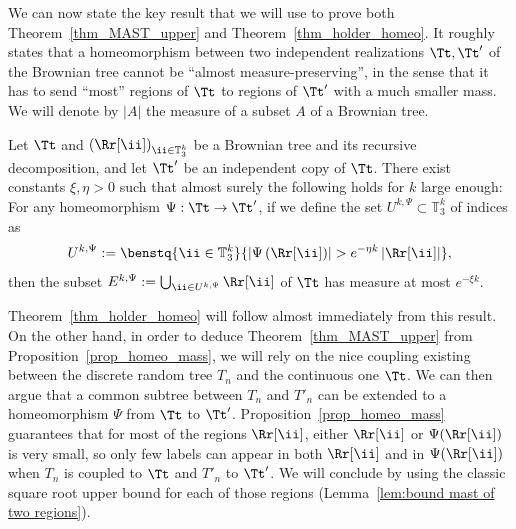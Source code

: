 We can now state the key result that we will use to prove both Theorem~\ref{thm_MAST_upper} and Theorem~\ref{thm_holder_homeo}.
It roughly states that a homeomorphism between two independent rea\-lizations $\Tt, \Tt'$ of the Brownian tree cannot be ``almost measure-preserving'', in the sense that it has to send ``most'' regions of $\Tt$ to regions of $\Tt'$ with a much smaller mass. We will denote by $|A|$ the measure of a subset $A$ of a Brownian tree.
\begin{proposition}\label{prop_homeo_mass}
Let $\Tt$ and $\left( \Rr[\ii] \right)_{\ii \in \mathbb{T}_3^k}$ be a Brownian tree and its recursive decomposition, and let $\Tt'$ be an independent copy of $\Tt$. There exist constants $\xi, \eta>0$ such that almost surely the following holds for $k$ large enough:
For any homeomorphism $\Psi : \Tt \to \Tt'$,
if we define the set $U^{k,\Psi} \subset \mathbb{T}_3^k$ of indices as
\begin{align*}
U^{k,\Psi}:= \benstq{\ii \in \mathbb{T}_3^k}{\left| \Psi \left( \Rr[\ii] \right) \right| > e^{-\eta k} \left| \Rr[\ii] \right|},
\end{align*}
then the subset
$
E^{k,\Psi}:= \bigcup_{\ii \in U^{k,\Psi}} \Rr[\ii]$ of $\Tt
$
has measure at most $e^{-\xi k}$.
\end{proposition}
Theorem~\ref{thm_holder_homeo} will follow almost immediately from this result.
On the other hand, in order to deduce Theorem~\ref{thm_MAST_upper} from Proposition~\ref{prop_homeo_mass}, we will rely on the nice coupling existing between the discrete random tree $T_n$ and the continuous one $\Tt$.
We can then argue that a common subtree between $T_n$ and $T'_n$ can be extended to a homeomorphism $\Psi$ from $\Tt$ to $\Tt'$.
Proposition~\ref{prop_homeo_mass} guarantees that for most of the regions $\Rr[\ii]$, either $\Rr[\ii]$ or $\Psi(\Rr[\ii])$ is very small, so only few labels can appear in both $\Rr[\ii]$ and in $\Psi(\Rr[\ii])$ when $T_n$ is coupled to $\Tt$ and $T'_n$ to $\Tt'$. We will conclude by using the classic square root upper bound for each of those regions (Lemma~\ref{lem:bound mast of two regions}).


